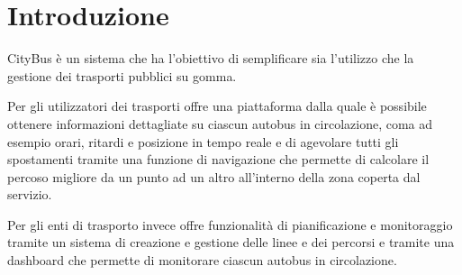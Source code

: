 \section{Introduzione}
CityBus è un sistema che ha l'obiettivo di semplificare sia l'utilizzo che la gestione dei trasporti pubblici su gomma.

Per gli utilizzatori dei trasporti offre una piattaforma dalla quale è possibile ottenere informazioni dettagliate su ciascun autobus in circolazione, coma ad esempio orari, ritardi e posizione in tempo reale e di agevolare tutti gli spostamenti tramite una funzione di navigazione che permette di calcolare il percoso migliore da un punto ad un altro all'interno della zona coperta dal servizio.

Per gli enti di trasporto invece offre funzionalità di pianificazione e monitoraggio tramite un sistema di creazione e gestione delle linee e dei percorsi e tramite una dashboard che permette di monitorare ciascun autobus in circolazione.